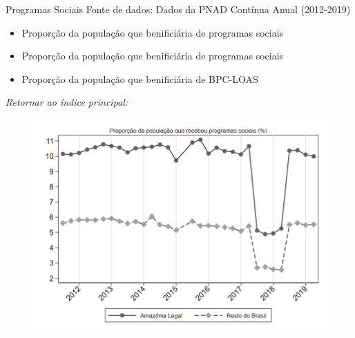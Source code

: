 \begin{frame}[label=_programas_sociais]{Programas Sociais}
{\footnotesize Fonte de dados: Dados da PNAD Contínua Anual (2012-2019)}
\begin{itemize}
\item{Proporção da população que benificiária de programas sociais \hyperlink{_programas_sociais_prop_ajuda_gov}{}}
\item{Proporção da população que benificiária de programas sociais  \hyperlink{_programas_sociais_prop_bolsa_familia}{}}
\item{Proporção da população que benificiária de BPC-LOAS  \hyperlink{_programas_sociais_prop_bpc_loas}{}}
\end{itemize}

\begin{small}
\textit{Retornar ao índice principal: \hyperlink{indice_principal}{} }
\end{small}

\end{frame}

\begin{frame}[label=_programas_sociais_prop_ajuda_gov]{}
\textit{\hyperlink{_programas_sociais}{}}
\begin{figure}
  \centering
  \includegraphics[width=1\linewidth]{../../analysis/output/programas_sociais/_programas_sociais_prop_ajuda_gov.png}
  \caption{}
  \label{fig:_programas_sociais_prop_ajuda_gov}
\end{figure}
\end{frame}

